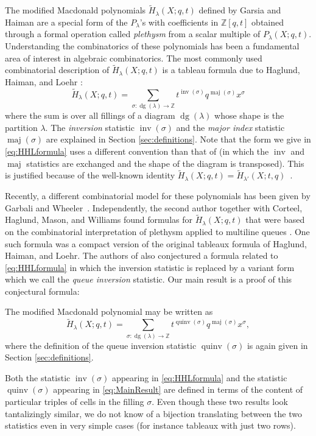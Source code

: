 \documentclass[ALCO,Unicode]{cedram}
\DeclareMathOperator{\dg}{dg}
\DeclareMathOperator{\maj}{maj}
\DeclareMathOperator{\inv}{inv}
\DeclareMathOperator{\quinv}{quinv}
\begin{document}
The modified Macdonald polynomials $\widetilde{H}_{\lambda}(X;q,t)$ defined by Garsia and Haiman \cite{garsia-haiman-1993} are a special form of the $P_{\lambda}$'s with coefficients in $\mathbb{Z}[q,t]$ obtained through a formal operation called \emph{plethysm} from a scalar multiple of $P_{\lambda}(X;q,t)$. Understanding the combinatorics of these polynomials has been a fundamental area of interest in algebraic combinatorics. The most commonly used combinatorial description of $\widetilde{H}_{\lambda}(X;q,t)$ is a tableau formula due to Haglund, Haiman, and Loehr \cite{HHL05}:
\begin{equation}
\label{eq:HHLformula}
\widetilde{H}_{\lambda}(X;q,t) = \sum_{\sigma:\dg(\lambda) \rightarrow \mathbb{Z}} t^{\inv(\sigma)}q^{\maj(\sigma)}x^{\sigma}
\end{equation}
where the sum is over all fillings of a diagram $\dg(\lambda)$ whose shape is the partition $\lambda$. The \emph{inversion} statistic $\inv(\sigma)$ and the \emph{major index} statistic $\maj(\sigma)$ are explained in Section \ref{sec:definitions}. Note that the form we give in \eqref{eq:HHLformula} uses a different convention than that of \cite{HHL05} (in which the $\inv$ and $\maj$ statistics are exchanged and the shape of the diagram is transposed). This is justified because of the well-known identity $\widetilde{H}_{\lambda}(X;q,t) = \widetilde{H}_{\lambda'}(X;t,q)$~\cite[Prop. 2.6]{Hai99}. 



Recently, a different combinatorial model for these polynomials has been given by Garbali and Wheeler~\cite{garbali-wheeler-2020}. Independently, the second author together with Corteel, Haglund, Mason, and Williams found formulas for $\widetilde{H}_{\lambda}(X;q,t)$ that were based on the combinatorial interpretation of plethysm applied to multiline queues \cite{compactformula}. One such formula was a compact version of the original tableaux formula of Haglund, Haiman, and Loehr. The authors of \cite{compactformula} also conjectured a formula related
to \eqref{eq:HHLformula} in which the inversion statistic is replaced by a variant
form which we call the \emph{queue inversion} statistic.
Our main result  is a proof of this conjectural formula:
\begin{thm*}
The modified Macdonald polynomial may be written as
\begin{equation}\label{eq:MainResult}
\widetilde{H}_{\lambda}(X;q,t) = \sum_{\sigma:\dg(\lambda) \rightarrow \mathbb{Z}} t^{\quinv(\sigma)}q^{\maj(\sigma)}x^{\sigma},
\end{equation}
where the definition of the queue inversion statistic $\quinv(\sigma)$ is 
again given in Section \ref{sec:definitions}.
\end{thm*}
Both the statistic $\inv(\sigma)$ appearing in \eqref{eq:HHLformula}
and the statistic $\quinv(\sigma)$ appearing in \eqref{eq:MainResult}
are defined in terms of the content of particular triples of cells in the filling $\sigma$. 
Even though these two results look tantalizingly similar, we do 
not know of a bijection translating between the two statistics even in very simple 
cases (for instance tableaux with just two rows). 
\end{document}
